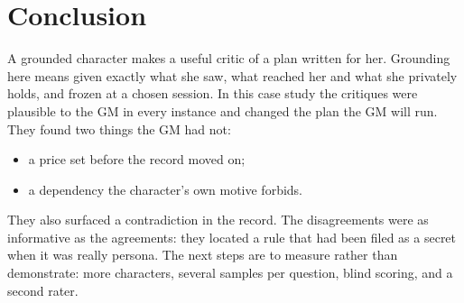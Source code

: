 \documentclass[11pt]{article}
\begin{document}
\section{Conclusion}

A grounded character makes a useful critic of a plan written for her. Grounding here means
given exactly what she saw, what reached her and what she privately holds, and frozen at a
chosen session. In this case study the critiques were plausible to the GM in every instance
and changed the plan the GM will run. They found two things the GM had not:
\begin{itemize}[nosep]
\item a price set before the record moved on;
\item a dependency the character's own motive forbids.
\end{itemize}
They also surfaced a contradiction in the record. The disagreements were as informative as
the agreements: they located a rule that had been filed as a secret when it was really
persona. The next steps are to measure rather than demonstrate: more characters, several
samples per question, blind scoring, and a second rater.
\end{document}
